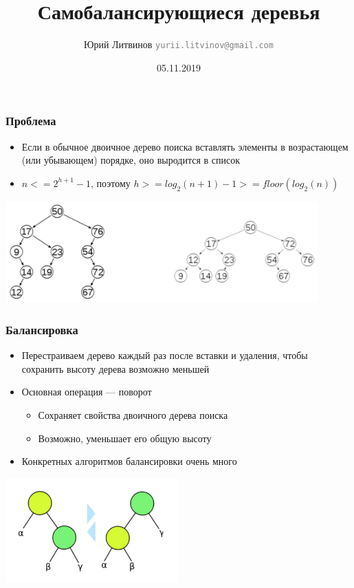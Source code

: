 \documentclass[xetex,mathserif,serif]{beamer}
\title{Самобалансирующиеся деревья}
\author[Юрий Литвинов]{Юрий Литвинов \newline \textcolor{gray}{\small\texttt{yurii.litvinov@gmail.com}}}
\date{05.11.2019}
\begin{document}
	
	\frame{\titlepage}
	
	\begin{frame}
		\frametitle{Проблема}
		\begin{itemize}
			\item Если в обычное двоичное дерево поиска вставлять элементы в возрастающем (или убывающем) порядке, оно выродится в список
			\item $n <= 2^{h + 1} - 1$, поэтому $h >= log_2(n + 1) - 1 >= floor(log_2(n))$
		\end{itemize}
		\begin{center}
			\includegraphics[width=0.9\textwidth]{tree-problem.png}
		\end{center}
	\end{frame}

	\begin{frame}
		\frametitle{Балансировка}
		\begin{itemize}
			\item Перестраиваем дерево каждый раз после вставки и удаления, чтобы сохранить высоту дерева возможно меньшей
			\item Основная операция --- поворот
			\begin{itemize}
				\item Сохраняет свойства двоичного дерева поиска
				\item Возможно, уменьшает его общую высоту
			\end{itemize}
			\item Конкретных алгоритмов балансировки очень много
		\end{itemize}
		\begin{center}
			\includegraphics[width=0.5\textwidth]{balancing.png}
		\end{center}
	\end{frame}
\end{document}
